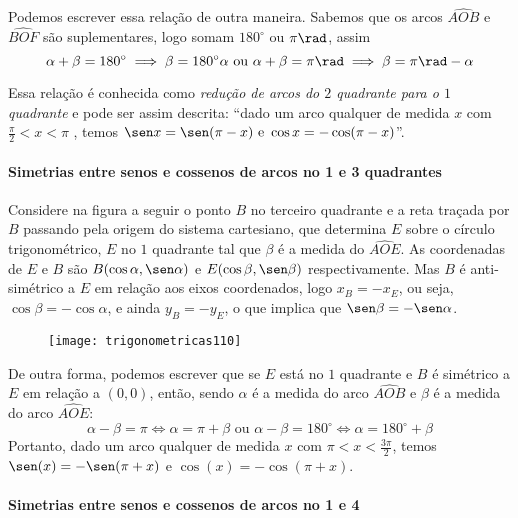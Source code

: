 Podemos escrever essa relação de outra maneira. Sabemos que os arcos $\widehat{AOB}$ e $\widehat{BOF}$ são suplementares, logo somam $180^{\circ}$ ou $\pi\rad$, assim
\begin{equation*}
\alpha+\beta=180^{\circ} \implies \beta = 180^{\circ}  \alpha\text{ ou }\alpha + \beta = \pi\rad \implies \beta = \pi\rad - \alpha
\end{equation*}

Essa relação é conhecida como \textit{redução de arcos do $2$ quadrante para o $1$ quadrante} e pode ser assim descrita: “dado um arco qualquer de medida $x$ com $\frac{\pi}{2} < x <\pi$ , temos $\sen x = \sen (\pi - x)\text{ e }\cos x = - \cos (\pi - x)$”.

\paragraph{Simetrias entre senos e cossenos de arcos no 1 e 3 quadrantes}

Considere na figura a seguir o ponto $B$ no terceiro quadrante e a reta traçada por $B$ passando pela origem do sistema cartesiano, que determina $E$ sobre o círculo trigonométrico, $E$ no $1$ quadrante tal que $\beta$ é a medida do $\widehat{AOE}$. As coordenadas de $E$ e $B$ são $B(\cos\alpha, \sen\alpha)$ e $E(\cos\beta, \sen\beta)$ respectivamente. Mas $B$ é anti-simétrico a $E$ em relação aos eixos coordenados, logo $x_B = - x_E$, ou seja, $\cos\beta = - \cos\alpha$, e ainda $y_B= - y_E$, o que implica que $\sen\beta = - \sen\alpha$.

\begin{figure}[H]
\centering

\texttt{[image: trigonometricas110]}
\end{figure}

De outra forma, podemos escrever que se $E$ está no $1$ quadrante e $B$ é simétrico a $E$ em relação a $(0,0)$, então, sendo $\alpha$ é a medida do arco $\widehat{AOB}$ e $\beta$ é a medida do arco $\widehat{AOE}$:
\begin{equation*}
\alpha-\beta=\pi\iff\alpha=\pi+\beta\text{ ou }\alpha-\beta=180^{\circ}\iff\alpha=180^{\circ}+\beta
\end{equation*}
Portanto, dado um arco qualquer de medida $x$ com $\pi<x<\frac{3\pi}{2}$, temos $\sen(x)=-\sen(\pi+x)$  e $\cos(x)=-\cos(\pi+x)$.

\paragraph{Simetrias entre senos e cossenos de arcos no 1 e 4}


